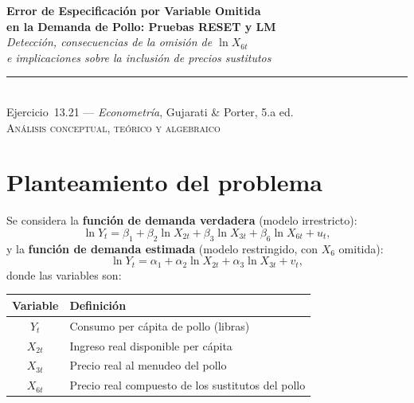 \documentclass[12pt, letterpaper]{article}
\begin{document}
\begin{center}
  {\LARGE\bfseries Error de Especificación por Variable Omitida}\\[6pt]
  {\LARGE\bfseries en la Demanda de Pollo: Pruebas RESET y LM}\\[12pt]
  {\large\itshape Detección, consecuencias de la omisión de $\ln X_{6t}$}\\
  {\large\itshape e implicaciones sobre la inclusión de precios sustitutos}\\[14pt]
  \rule{0.55\linewidth}{0.6pt}\\[8pt]
  {\normalsize Ejercicio~13.21 --- \textit{Econometría}, Gujarati \& Porter, 5.a ed.}\\[4pt]
  {\small\textsc{Análisis conceptual, teórico y algebraico}}
\end{center}

\vspace{10pt}

\section{Planteamiento del problema}

Se considera la \textbf{función de demanda verdadera} (modelo irrestricto):
\begin{equation}
  \ln Y_t = \beta_1 + \beta_2 \ln X_{2t} + \beta_3 \ln X_{3t}
            + \beta_6 \ln X_{6t} + u_t,
  \label{eq:verdadero}
\end{equation}
y la \textbf{función de demanda estimada} (modelo restringido, con $X_6$ omitida):
\begin{equation}
  \ln Y_t = \alpha_1 + \alpha_2 \ln X_{2t} + \alpha_3 \ln X_{3t} + v_t,
  \label{eq:omitido}
\end{equation}
donde las variables son:

\begin{center}
\renewcommand{\arraystretch}{1.3}
\small
\begin{tabular}{cl}
\toprule
\textbf{Variable} & \textbf{Definición} \\
\midrule
$Y_t$    & Consumo per cápita de pollo (libras) \\
$X_{2t}$ & Ingreso real disponible per cápita \\
$X_{3t}$ & Precio real al menudeo del pollo \\
$X_{6t}$ & Precio real compuesto de los sustitutos del pollo \\
\bottomrule
\end{tabular}
\end{center}
\end{document}
